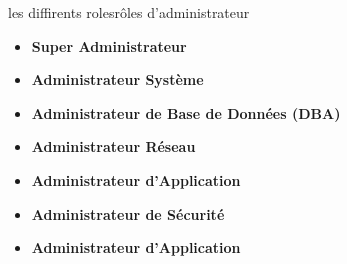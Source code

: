 \begin{frame}{les diffirents rolesrôles d'administrateur }
\begin{itemize}
    \item 	\textbf{Super Administrateur}

    
    \item 	\textbf{	Administrateur Système }
    
    \item 	\textbf{	Administrateur de Base de Données (DBA) }
    
    \item 	\textbf{	Administrateur Réseau }
    \item 	\textbf{	Administrateur d'Application }
    \item 	\textbf{	Administrateur de Sécurité  }
    \item 	\textbf{     Administrateur d'Application }
\end{itemize}
    
\end{frame}